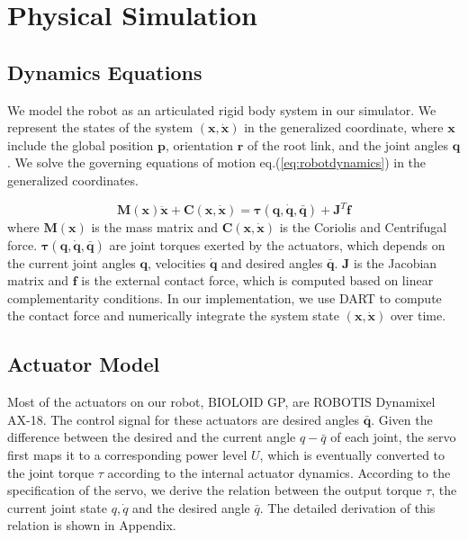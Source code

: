 \section{Physical Simulation}

\subsection{Dynamics Equations}

We model the robot as an articulated rigid body system in our simulator. We represent the states of the system $(\mathbf{x}, \dot{\mathbf{x}})$ in the generalized coordinate, where $\mathbf{x}$ include the global position $\mathbf{p}$, orientation $\mathbf{r}$ of the root link, and the joint angles $\mathbf{q}$. We solve the governing equations of motion eq.(\ref{eq:robotdynamics}) in the generalized coordinates.

\begin{equation}
\label{eq:robotdynamics}
\mathbf{M}(\mathbf{x})\mathbf{\ddot{x}}+\mathbf{C}(\mathbf{x},\mathbf{\dot{x}})=\mathbf{\tau}(\mathbf{q}, \dot{\mathbf{q}}, \bar{\mathbf{q}})+\mathbf{J}^T\mathbf{f}
\end{equation}
where $\mathbf{M}(\mathbf{x})$ is the mass matrix and $\mathbf{C}(\mathbf{x},\mathbf{\dot{x}})$ is the Coriolis and Centrifugal force. $\mathbf{\tau}(\mathbf{q}, \dot{\mathbf{q}}, \bar{\mathbf{q}})$ are joint torques exerted by the actuators, which depends on the current joint angles $\mathbf{q}$, velocities $\dot{\mathbf{q}}$ and desired angles $\bar{\mathbf{q}}$. $\mathbf{J}$ is the Jacobian matrix and $\mathbf{f}$ is the external contact force, which is computed based on linear complementarity conditions. In our implementation, we use DART to compute the contact force and numerically integrate the system state $(\mathbf{x}, \dot{\mathbf{x}})$ over time.

\subsection{Actuator Model}
\label{sec:motorDynamics}
Most of the actuators on our robot, BIOLOID GP, are ROBOTIS Dynamixel AX-18. The control signal for these actuators are desired angles $\bar{\mathbf{q}}$. Given the difference between the desired and the current angle ${q-\bar{q}}$ of each joint, the servo first maps it to a corresponding power level $U$, which is eventually converted to the joint torque $\tau$ according to the internal actuator dynamics. According to the specification of the servo, we derive the relation between the output torque $\tau$, the current joint state $q, \dot{q}$ and the desired angle $\bar{q}$. The detailed derivation of this relation is shown in Appendix.

